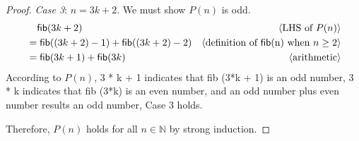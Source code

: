 \documentclass[11pt,fleqn]{article}
\newcommand{\mname}[1]{\mbox{\sf #1}}
\newcommand{\pnote}[1]{{\langle \text{#1} \rangle}}
\begin{document}
\begin{enumerate}
\begin{proof}
    \emph{Case 3}: $n = 3k + 2$. We must show $P(n)$ is odd.
    \begin{align*}
      & \phantom{{}=} \mname{fib}(3k + 2) & \pnote{LHS of $P(n)$}\\
      & = \mname{fib} ((3k + 2) - 1) + \mname{fib} ((3k + 2) - 2) & \pnote{definition of \mname{fib}(n) when $n \ge 2$}\\
      & = \mname{fib} (3k + 1) + \mname{fib} (3k) & \pnote{arithmetic}
    \end{align*}
    According to $P(n)$, 3 * k + 1 indicates that \mname{fib} (3*k + 1) is an odd number,  3 * k indicates that \mname{fib} (3*k) is an even number,
    and an odd number plus even number results an odd number, Case 3 holds.

    \medskip
    Therefore, $P(n)$ holds for all $n \in \mathbb{N}$ by strong induction.
  \end{proof} 

\end{enumerate}
\end{document}
